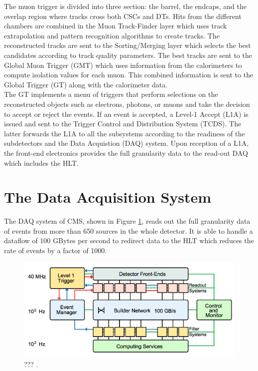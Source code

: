     The muon trigger is divided into three section: the barrel, the endcaps, and the overlap region where tracks cross both CSCs and DTs. Hits from the different chambers are combined in the Muon Track-Finder layer which uses track extrapolation and pattern recognition algorithms to create tracks. The reconstructed tracks are sent to the Sorting/Merging layer which selects the best candidates according to track quality parameters. The best tracks are sent to the Global Muon Trigger (GMT) which uses information from the calorimeters to compute isolation values for each muon. This combined information is sent to the Global Trigger (GT) along with the calorimeter data. \\

    The GT implements a menu of triggers that perform selections on the reconstructed objects such as electrons, photons, or muons and take the decision to accept or reject the events. If an event is accepted, a Level-1 Accept (L1A) is issued and sent to the Trigger Control and Distribution System (TCDS). The latter forwards the L1A to all the subsystems according to the readiness of the subdetectors and the Data Acquistion (DAQ) system. Upon reception of a L1A, the front-end electronics provides the full granularity data to the read-out DAQ which includes the HLT.

  \section{The Data Acquisition System}

    The DAQ system of CMS, shown in Figure \ref{fig:I-3-daq}, reads out the full granularity data of events from more than 650 sources in the whole detector. It is able to handle a dataflow of 100 GBytes per second to redirect data to the HLT which reduces the rate of events by a factor of 1000. \\

      \begin{figure}[h!]
        \centering
        \includegraphics[width=\textwidth]{img/I-3-cms/daq.png}
        \caption{??? \cite{1748-0221-3-08-S08004}.}
        \label{fig:I-3-daq}
      \end{figure}

